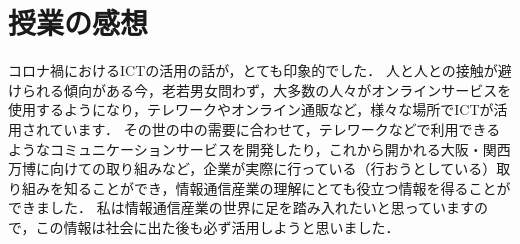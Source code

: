 \section*{授業の感想}
コロナ禍におけるICTの活用の話が，とても印象的でした．
人と人との接触が避けられる傾向がある今，老若男女問わず，大多数の人々がオンラインサービスを使用するようになり，テレワークやオンライン通販など，様々な場所でICTが活用されています．
その世の中の需要に合わせて，テレワークなどで利用できるようなコミュニケーションサービスを開発したり，これから開かれる大阪・関西万博に向けての取り組みなど，企業が実際に行っている（行おうとしている）取り組みを知ることができ，情報通信産業の理解にとても役立つ情報を得ることができました．
私は情報通信産業の世界に足を踏み入れたいと思っていますので，この情報は社会に出た後も必ず活用しようと思いました．
